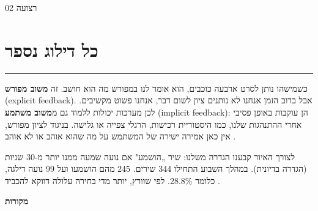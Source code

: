 {\sffamily\small\color{charcoal}רצועה 02\par}
\section*{\sffamily כל דילוג נספר}
{\color{brandgreen}\rule{\linewidth}{1.2pt}}\par\medskip
כשמישהו נותן לסרט ארבעה כוכבים, הוא אומר לנו במפורש מה הוא חושב. זה \textbf{משוב מפורש} (explicit feedback). אבל ברוב הזמן אנחנו לא נותנים ציון לשום דבר, אנחנו פשוט מקשיבים. לכן מערכות יכולות ללמוד גם מ\textbf{משוב משתמע} (implicit feedback): הן עוקבות באופן פסיבי אחרי ההתנהגות שלנו, כמו היסטוריית רכישות, הרגלי צפייה או גלישה. בניגוד לציון מפורש, אין כאן אמירה ישירה של המשתמש על מה שהוא אוהב או לא אוהב \cite{hu2008collaborative}.

לצורך האיור קבענו הגדרה משלנו: שיר „הושמע" אם נועה שמעה ממנו יותר מ-30 שניות (הגדרה בדיונית). במהלך השבוע התחילו 344 שירים. 245 מהם הושמעו ועל 99 נועה דילגה, כלומר 28.8\%. לפי שוורץ, יותר מדי בחירה עלולה דווקא להכביד \cite{schwartz2004paradox}.

\begin{center}
\end{center}

{\sffamily\bfseries\color{charcoal}מקורות\par}
\begin{otherlanguage}{english}
\printbibliography[heading=none]
\end{otherlanguage}
